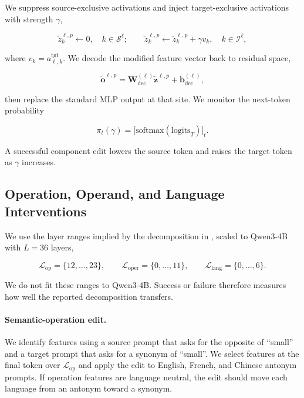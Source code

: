 We suppress source-exclusive activations and inject target-exclusive activations
with strength $\gamma$,

\begin{equation}
  \tilde{z}^{\ell,p}_k \leftarrow 0,
  \quad k \in \mathcal{S}^\ell;
  \qquad
  \tilde{z}^{\ell,p}_k \leftarrow \tilde{z}^{\ell,p}_k + \gamma v_k,
  \quad k \in \mathcal{I}^\ell,
  \label{eq:suppress-inject}
\end{equation}

where $v_k=a_{\ell,k}^{\mathrm{tgt}}$.  We decode the modified feature vector
back to residual space,

\begin{equation}
  \tilde{\mathbf{o}}^{\ell,p}
    = \mathbf{W}_{\mathrm{dec}}^{(\ell)}\tilde{\mathbf{z}}^{\ell,p}
      + \mathbf{b}_{\mathrm{dec}}^{(\ell)},
  \label{eq:decode-multi}
\end{equation}

then replace the standard MLP output at that site.  We monitor the next-token
probability

\begin{equation}
  \pi_t(\gamma)
    = \bigl[\mathrm{softmax}(\mathrm{logits}_T)\bigr]_t.
  \label{eq:pi-gamma}
\end{equation}

A successful component edit lowers the source token and raises the target token
as $\gamma$ increases.

\subsection{Operation, Operand, and Language Interventions}
\label{subsec:multilingual-experiments}

We use the layer ranges implied by the decomposition in
\citet{lindsey2025biology}, scaled to Qwen3-4B with $L=36$ layers,

\begin{equation}
  \mathcal{L}_{\mathrm{op}} = \{12,\ldots,23\},
  \qquad
  \mathcal{L}_{\mathrm{oper}} = \{0,\ldots,11\},
  \qquad
  \mathcal{L}_{\mathrm{lang}} = \{0,\ldots,6\}.
  \label{eq:layer-ranges}
\end{equation}

We do not fit these ranges to Qwen3-4B.  Success or failure therefore measures
how well the reported decomposition transfers.

\paragraph{Semantic-operation edit.}
We identify features using a source prompt that asks for the opposite of
``small'' and a target prompt that asks for a synonym of ``small''.  We select
features at the final token over $\mathcal{L}_{\mathrm{op}}$ and apply the edit
to English, French, and Chinese antonym prompts.  If operation features are
language neutral, the edit should move each language from an antonym toward a
synonym.

